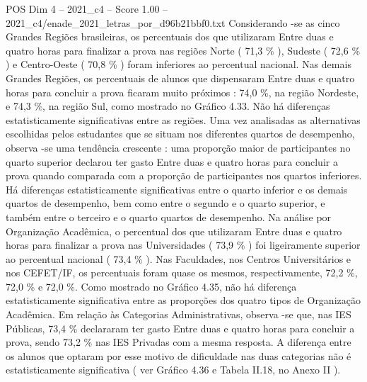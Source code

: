 \begin{textsample}{POS Dim 4 – 2021\_c4 – Score 1.00 – 2021\_c4/enade\_2021\_letras\_por\_d96b21bbf0.txt}
Considerando -se as cinco Grandes Regiões brasileiras, os percentuais dos que utilizaram Entre duas e quatro horas para finalizar a prova nas regiões Norte ( 71,3 \% ), Sudeste ( 72,6 \% ) e Centro-Oeste ( 70,8 \% ) foram inferiores ao percentual nacional.
Nas demais Grandes Regiões, os percentuais de alunos que dispensaram Entre duas e quatro horas para concluir a prova ficaram muito próximos : 74,0 \%, na região Nordeste, e 74,3 \%, na região Sul, como mostrado no Gráfico 4.33.
Não há diferenças estatisticamente significativas entre as regiões.
Uma vez analisadas as alternativas escolhidas pelos estudantes que se situam nos diferentes quartos de desempenho, observa -se uma tendência crescente : uma proporção maior de participantes no quarto superior declarou ter gasto Entre duas e quatro horas para concluir a prova quando comparada com a proporção de participantes nos quartos inferiores.
Há diferenças estatisticamente significativas entre o quarto inferior e os demais quartos de desempenho, bem como entre o segundo e o quarto superior, e também entre o terceiro e o quarto quartos de desempenho.
Na análise por Organização Acadêmica, o percentual dos que utilizaram Entre duas e quatro horas para finalizar a prova nas Universidades ( 73,9 \% ) foi ligeiramente superior ao percentual nacional ( 73,4 \% ).
Nas Faculdades, nos Centros Universitários e nos CEFET/IF, os percentuais foram quase os mesmos, respectivamente, 72,2 \%, 72,0 \% e 72,0 \%.
Como mostrado no Gráfico 4.35, não há diferença estatisticamente significativa entre as proporções dos quatro tipos de Organização Acadêmica.
Em relação às Categorias Administrativas, observa -se que, nas IES Públicas, 73,4 \% declararam ter gasto Entre duas e quatro horas para concluir a prova, sendo 73,2 \% nas IES Privadas com a mesma resposta.
A diferença entre os alunos que optaram por esse motivo de dificuldade nas duas categorias não é estatisticamente significativa ( ver Gráfico 4.36 e Tabela II.18, no Anexo II ).

\end{textsample}
